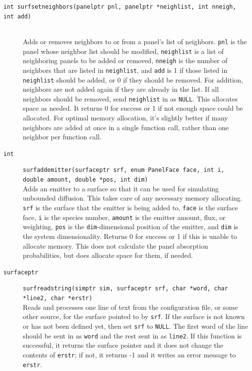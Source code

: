 \documentclass {scrbook}
\newcommand {\ttt} {\texttt}
\begin{document}
\begin{description}
\item[\ttt{int surfsetneighbors(panelptr pnl, panelptr *neighlist, int nneigh, int add)}]
\hfill \\
Adds or removes neighbors to or from a panel's list of neighbors. \ttt{pnl} is the panel whose neighbor list should be modified, \ttt{neighlist} is a list of neighboring panels to be added or removed, \ttt{nneigh} is the number of neighbors that are listed in \ttt{neighlist}, and \ttt{add} is 1 if those listed in \ttt{neighlist} should be added, or 0 if they should be removed. For addition, neighbors are not added again if they are already in the list. If all neighbors should be removed, send \ttt{neighlist} in as \ttt{NULL}. This allocates space as needed. It returns 0 for success or 1 if not enough space could be allocated. For optimal memory allocation, it's slightly better if many neighbors are added at once in a single function call, rather than one neighbor per function call.

\item[\ttt{int}]
\ttt{surfaddemitter(surfaceptr srf, enum PanelFace face, int i, double amount, double *pos, int dim)}
\hfill \\
Adds an emitter to a surface so that it can be used for simulating unbounded diffusion. This takes care of any necessary memory allocating. \ttt{srf} is the surface that the emitter is being added to, \ttt{face} is the surface face, \ttt{i} is the species number, \ttt{amount} is the emitter amount, flux, or weighting, \ttt{pos} is the \ttt{dim}-dimensional position of the emitter, and \ttt{dim} is the system dimensionality. Returns 0 for success or 1 if this is unable to allocate memory. This does not calculate the panel absorption probabilities, but does allocate space for them, if needed.

\item[\ttt{surfaceptr}]
\ttt{surfreadstring(simptr sim, surfaceptr srf, char *word, char *line2, char *erstr)}
\hfill \\
Reads and processes one line of text from the configuration file, or some other source, for the surface pointed to by \ttt{srf}. If the surface is not known or has not been defined yet, then set \ttt{srf} to \ttt{NULL}. The first word of the line should be sent in as \ttt{word} and the rest sent in as \ttt{line2}. If this function is successful, it returns the surface pointer and it does not change the contents of \ttt{erstr}; if not, it returns -1 and it writes an error message to \ttt{erstr}.


\end{description}
\end{document}
